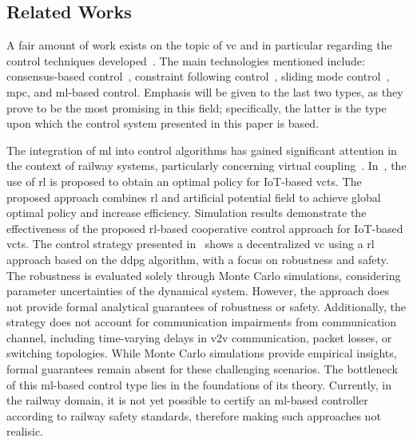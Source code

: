 \documentclass[letterpaper, 10 pt, conference]{ieeeconf}
\theoremstyle{definition}
\theoremstyle{nopoint}
\begin{document}
\subsection{Related Works}
\label{subsec:relatedWorks}

 A fair amount of work exists on the topic of \gls{vc} and in particular regarding the control techniques developed~\cite{wu2023railway}. The main technologies mentioned include: consensus-based control~\cite{wu2023dynamics}, constraint following control~\cite{zhang2023optimal,wang2022constraint}, sliding mode control~\cite{park2022,liu2023method}, \gls{mpc}, and \gls{ml}-based control. Emphasis will be given to the last two types, as they prove to be the most promising in this field; specifically, the latter is the type upon which the control system presented in this paper is based.

The integration of \gls{ml} into control algorithms has gained significant attention in the context of railway systems, particularly concerning virtual coupling~\cite{basile2022roadmap}. In~\cite{wang2021}, the use of \gls{rl} is proposed to obtain an optimal policy for IoT-based \gls{vcts}. The proposed approach combines \gls{rl} and artificial potential field to achieve global optimal policy and increase efficiency. Simulation results demonstrate the effectiveness of the proposed \gls{rl}-based cooperative control approach for IoT-based \gls{vcts}. The control strategy presented in~\cite{BASILE2024108120} shows a decentralized \gls{vc} using a \gls{rl} approach based on the \gls{ddpg} algorithm, with a focus on robustness and safety. The robustness is evaluated solely through Monte Carlo simulations, considering parameter uncertainties of the dynamical system. However, the approach does not provide formal analytical guarantees of robustness or safety. Additionally, the strategy does not account for communication impairments from communication channel, including time-varying delays in \gls{v2v} communication, packet losses, or switching topologies. While Monte Carlo simulations provide empirical insights, formal guarantees remain absent for these challenging scenarios.
%
The bottleneck of this \gls{ml}-based control type lies in the foundations of its theory. Currently, in the railway domain, it is not yet possible to certify an \gls{ml}-based controller according to railway safety standards, therefore making such approaches not realisic.
\end{document}
